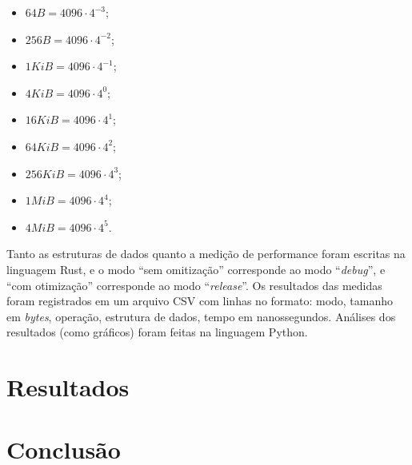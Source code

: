 \documentclass[a4paper]{article}
\begin{document}
\begin{itemize}
    \item $64 B = 4096 \cdot 4^{-3}$;
    \item $256 B = 4096 \cdot 4^{-2}$;
    \item $1 KiB = 4096 \cdot 4^{-1}$;
    \item $4 KiB = 4096 \cdot 4^{0}$;
    \item $16 KiB = 4096 \cdot 4^{1}$;
    \item $64 KiB = 4096 \cdot 4^{2}$;
    \item $256 KiB = 4096 \cdot 4^{3}$;
    \item $1 MiB = 4096 \cdot 4^{4}$;
    \item $4 MiB = 4096 \cdot 4^{5}$.
\end{itemize}

Tanto as estruturas de dados quanto a medição de performance foram escritas na
linguagem Rust, e o modo ``sem omitização'' corresponde ao modo
``\textit{debug}'', e ``com otimização'' corresponde ao modo
``\textit{release}''. Os resultados das medidas foram registrados em um arquivo
CSV com linhas no formato: modo, tamanho em \textit{bytes}, operação, estrutura
de dados, tempo em nanossegundos. Análises dos resultados (como gráficos) foram
feitas na linguagem Python.

\section{Resultados}

\section{Conclusão}

\nocite{*}
\printbibliography
\end{document}
